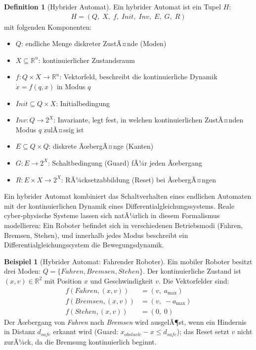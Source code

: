 ﻿\documentclass[a4paper,12pt]{article}
\theoremstyle{definition}
\newtheorem{definition}{Definition}[section]
\newtheorem{beispiel}{Beispiel}[section]
\begin{document}
\begin{definition}[Hybrider Automat]
Ein hybrider Automat ist ein Tupel $H$:
\begin{align*}
  H = (Q,\; X,\; f,\; \mathit{Init},\; \mathit{Inv},\; E,\; G,\; R)
\end{align*}
mit folgenden Komponenten:
\begin{itemize}
  \item[-] $Q$: endliche Menge diskreter ZustÃ¤nde (Moden)
  \item[-] $X \subseteq \mathbb{R}^n$: kontinuierlicher Zustandsraum
  \item[-] $f: Q \times X \to \mathbb{R}^n$: Vektorfeld, beschreibt die kontinuierliche Dynamik $\dot{x} = f(q, x)$ in Modus $q$
  \item[-] $\mathit{Init} \subseteq Q \times X$: Initialbedingung
  \item[-] $\mathit{Inv}: Q \to 2^X$: Invariante, legt fest, in welchen kontinuierlichen ZustÃ¤nden Modus $q$ zulÃ¤ssig ist
  \item[-] $E \subseteq Q \times Q$: diskrete ÃœbergÃ¤nge (Kanten)
  \item[-] $G: E \to 2^X$: Schaltbedingung (Guard) fÃ¼r jeden Ãœbergang
  \item[-] $R: E \times X \to 2^X$: RÃ¼cksetzabbildung (Reset) bei ÃœbergÃ¤ngen
\end{itemize}
\end{definition}

Ein hybrider Automat kombiniert das Schaltverhalten eines endlichen Automaten mit der kontinuierlichen Dynamik eines Differentialgleichungssystems. Reale cyber-physische Systeme lassen sich natÃ¼rlich in diesem Formalismus modellieren: Ein Roboter befindet sich in verschiedenen Betriebsmodi (Fahren, Bremsen, Stehen), und innerhalb jedes Modus beschreibt ein Differentialgleichungssystem die Bewegungsdynamik.

\begin{beispiel}[Hybrider Automat: Fahrender Roboter]
Ein mobiler Roboter besitzt drei Moden: $Q = \{\mathit{Fahren}, \mathit{Bremsen}, \mathit{Stehen}\}$. Der kontinuierliche Zustand ist $(x, v) \in \mathbb{R}^2$ mit Position $x$ und Geschwindigkeit $v$. Die Vektorfelder sind:
\begin{align}
  f(\mathit{Fahren}, (x,v))  &= (v,\; a_{\max}) \\
  f(\mathit{Bremsen}, (x,v)) &= (v,\; -a_{\max}) \\
  f(\mathit{Stehen}, (x,v))  &= (0,\; 0)
\end{align}
Der Ãœbergang von \textit{Fahren} nach \textit{Bremsen} wird ausgelÃ¶st, wenn ein Hindernis in Distanz $d_{\mathit{safe}}$ erkannt wird (Guard: $x_{\mathit{obstacle}} - x \leq d_{\mathit{safe}}$); das Reset setzt $v$ nicht zurÃ¼ck, da die Bremsung kontinuierlich beginnt.
\end{beispiel}
\end{document}

